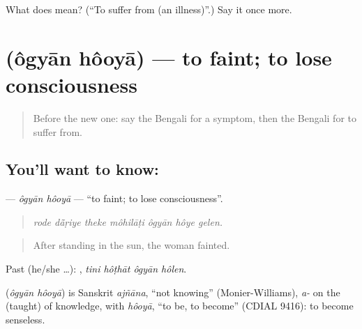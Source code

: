 \begin{tcolorbox}[breakable,colback=teal!4,colframe=teal!35!black,title={Before you move on}]
What does  mean? (\textquotedblleft{}To suffer from (an illness)\textquotedblright{}.) Say it once more.
\end{tcolorbox}
\section[\texorpdfstring{\bn{অজ্ঞান} \bn{হওয়া} (ôgyān hôoyā)}{অজ্ঞান হওয়া (ôgyān hôoyā)}]{  (ôgyān hôoyā) — to faint; to lose consciousness}

\label{lesson:BN-C471-ogyan-hooya}



\begin{quote}
Before the new one: say the Bengali for a symptom, then the Bengali for to suffer from.
\end{quote}

\subsection*{You'll want to know:  }
\textbf{ } — \emph{ôgyān hôoyā} — \textquotedblleft{}to faint; to lose consciousness\textquotedblright{}.

\begin{quote}
      
\end{quote}

\begin{quote}
\emph{rode dā̃ṛiye theke môhilāṭi ôgyān hôye gelen.}
\end{quote}

\begin{quote}
After standing in the sun, the woman fainted.
\end{quote}

Past (he/she …):    , \emph{tini hôṭhāt ôgyān hôlen}.

\begin{cousinweb}
\textbf{ } (\emph{ôgyān hôoyā}) is Sanskrit \emph{ajñāna}, \textquotedblleft{}not knowing\textquotedblright{} (Monier-Williams), \emph{a-} on the  (taught) of knowledge, with \emph{hôoyā}, \textquotedblleft{}to be, to become\textquotedblright{} (CDIAL 9416): to become senseless.
\end{cousinweb}

